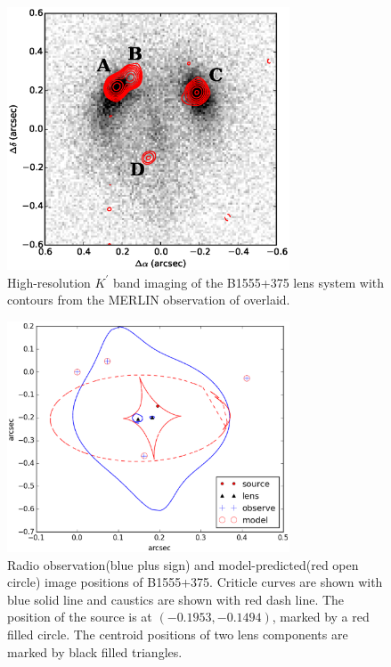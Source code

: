 \documentclass[useAMS,usenatbib]{mnras}
\begin{document}
\begin{figure}
\includegraphics[width=84mm]{1555_ao_merlin_overlay.eps}
\caption{High-resolution  $K^\prime$ band imaging of the B1555+375 lens system 
with contours from the MERLIN observation of \citet{Marlow99} overlaid. 
%
\label{fig:merlin}}
\end{figure}


\begin{figure}
\includegraphics[width=84mm]{gravlens_exp_try5_plot.eps}
\caption{Radio observation(blue plus sign) and model-predicted(red open circle) image positions of B1555+375. Criticle curves are shown with blue solid line and caustics are shown with red dash line. The position of the source is at $(-0.1953,-0.1494)$, marked by a red filled circle. The centroid positions of two lens components are marked by black filled triangles.  \label{fig2}}
\end{figure}

\end{document}
